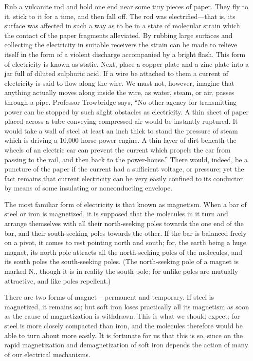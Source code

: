 \begin{linenumbers*}
\indent Rub a vulcanite rod and hold one end near some tiny pieces of paper. They fly to it, stick to it for a time, and then fall off. The rod was electrified—that is, its surface was affected in such a way as to be in a state of molecular strain which the contact of the paper fragments alleviated. By rubbing large surfaces and collecting the electricity in suitable receivers the strain can be made to relieve itself in the form of a violent discharge accompanied by a bright flash. This form of electricity is known as static.
Next, place a copper plate and a zinc plate into a jar full of diluted sulphuric acid. If a wire be attached to them a current of electricity is said to flow along the wire. We must not, however, imagine that anything actually moves along inside the wire, as water, steam, or air, passes through a pipe. Professor Trowbridge says, ``No other agency for transmitting power can be stopped by such slight obstacles as electricity. A thin sheet of paper placed across a tube conveying compressed air would be instantly ruptured. It would take a wall of steel at least an inch thick to stand the pressure of steam which is driving a 10,000 horse-power engine. A thin layer of dirt beneath the wheels of an electric car can prevent the current which propels the car from passing to the rail, and then back to the power-house.'' There would, indeed, be a puncture of the paper if the current had a sufficient voltage, or pressure; yet the fact remains that current electricity can be very easily confined to its conductor by means of some insulating or nonconducting envelope.

\indent The most familiar form of electricity is that known as magnetism. When a bar of steel or iron is magnetized, it is supposed that the molecules in it turn and arrange themselves with all their north-seeking poles towards the one end of the bar, and their south-seeking poles towards the other. If the bar is balanced freely on a pivot, it comes to rest pointing north and south; for, the earth being a huge magnet, its north pole attracts all the north-seeking poles of the molecules, and its south poles the south-seeking poles. (The north-seeking pole of a magnet is marked N., though it is in reality the south pole; for unlike poles are mutually attractive, and like poles repellent.)

\indent There are two forms of magnet -- permanent and temporary. If steel is magnetized, it remains so; but soft iron loses practically all its magnetism as soon as the cause of magnetization is withdrawn. This is what we should expect; for steel is more closely compacted than iron, and the molecules therefore would be able to turn about more easily. It is fortunate for us that this is so, since on the rapid magnetization and demagnetization of soft iron depends the action of many of our electrical mechanisms.
\end{linenumbers*}


